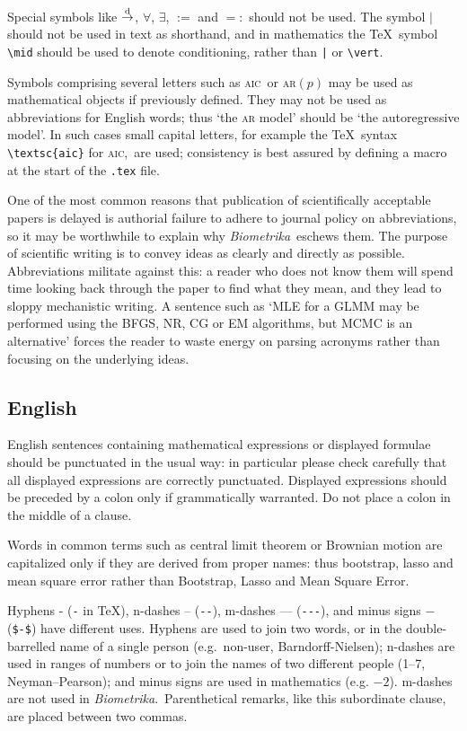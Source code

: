 \documentclass[lineno]{biometrika}
\def\Bka{{\it Biometrika}}
\def\AIC{\textsc{aic}}
\begin{document}
Special symbols like $\mathop{\rightarrow}\limits^{\rm d}$, $\forall$, $\exists$, $:=$ and $=:$  should not be used.  The symbol $\mid$ should not be used in text as shorthand, and in mathematics the \TeX\ symbol \verb+\mid+ should be used to denote conditioning, rather than \verb+|+ or \verb"\vert".

Symbols comprising several letters such as \AIC\ or \textsc{ar}$(p)$ may be used as mathematical objects if previously defined. They may not be used as abbreviations for English words; thus `the \textsc{ar} model' should be `the autoregressive model'.   In such cases small capital letters, for example the  \TeX\ syntax \verb+\textsc{aic}+ for \AIC,\ are used; consistency is best assured by defining a macro at the start of the \texttt{.tex}  file.

One of the most common reasons that publication of scientifically acceptable papers is delayed is authorial  failure to adhere to journal policy on abbreviations, so it may be worthwhile to explain why \Bka\ eschews them. The purpose of scientific writing is to convey ideas as clearly and directly as possible.  Abbreviations militate against this: a reader who does not know them will spend time looking back through the paper to find what they mean, and they lead to sloppy mechanistic writing. A sentence such as `MLE for a GLMM may be performed using the BFGS, NR, CG or EM algorithms, but MCMC is an alternative' forces the reader to waste energy on parsing acronyms  rather than focusing on the underlying ideas.

\subsection{English}

English sentences containing mathematical expressions or displayed formulae should be punctuated in the usual way: in particular please check carefully that all displayed expressions are correctly punctuated.  Displayed expressions should be preceded by a colon only if grammatically warranted. Do not place a colon in the middle of a clause.

Words in common terms such as central limit theorem or Brownian motion are capitalized only if they are derived from proper names: thus bootstrap,  lasso and mean square error rather than Bootstrap, Lasso and  Mean Square Error.

Hyphens - (\verb+-+ in \TeX), n-dashes -- (\verb+--+), m-dashes --- (\verb+---+), and minus signs $-$ (\verb+$-$+) have different uses.  Hyphens are used to join two words, or in the double-barrelled name of a single person (e.g.\ non-user, Barndorff-Nielsen); n-dashes are used in ranges of numbers or to join the names of two different people (1--7, Neyman--Pearson); and minus signs are used in mathematics (e.g. $-2$). m-dashes are not used in \Bka.\  Parenthetical remarks, like this subordinate clause, are placed between two commas.
\end{document}
